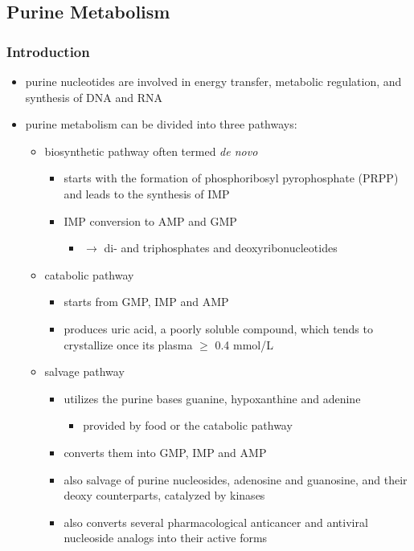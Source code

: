 \documentclass[12pt]{scrartcl}
\begin{document}
\subsection{Purine Metabolism}
\label{sec:org4d82218}
\subsubsection{Introduction}
\label{sec:org1a73164}
\begin{itemize}
\item purine nucleotides are involved in energy transfer, metabolic
regulation, and synthesis of DNA and RNA
\item purine metabolism can be divided into three pathways:
\begin{itemize}
\item biosynthetic pathway often termed \emph{de novo}
\begin{itemize}
\item starts with the formation of phosphoribosyl pyrophosphate (PRPP)
and leads to the synthesis of IMP
\item IMP conversion to AMP and GMP
\begin{itemize}
\item \(\to\) di- and triphosphates and deoxyribonucleotides
\end{itemize}
\end{itemize}
\item catabolic pathway
\begin{itemize}
\item starts from GMP, IMP and AMP
\item produces uric acid, a poorly soluble compound, which tends to
crystallize once its plasma \(\ge\) 0.4 mmol/L
\end{itemize}
\item salvage pathway
\begin{itemize}
\item utilizes the purine bases guanine, hypoxanthine and adenine
\begin{itemize}
\item provided by food or the catabolic pathway
\end{itemize}
\item converts them into GMP, IMP and AMP
\item also salvage of purine nucleosides, adenosine and guanosine, and
their deoxy counterparts, catalyzed by kinases
\item also converts several pharmacological anticancer and antiviral
nucleoside analogs into their active forms
\end{itemize}
\end{itemize}


\end{itemize}
\end{document}
